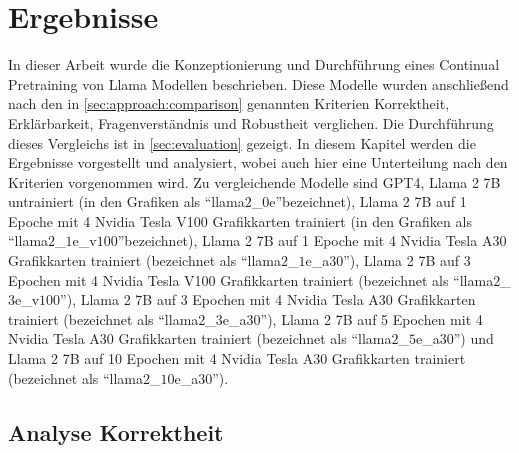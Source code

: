 \chapter{Ergebnisse}\label{ch:results}
\newcommand{\lo}{\enquote{llama$2$\_$0$e}}
\newcommand{\liv}{\enquote{llama$2$\_$1$e\_v$100$}}
\newcommand{\lia}{\enquote{llama$2$\_$1$e\_a$30$}}
\newcommand{\lev}{\enquote{llama$2$\_$3$e\_v$100$}}
\newcommand{\lea}{\enquote{llama$2$\_$3$e\_a$30$}}
\newcommand{\lsa}{\enquote{llama$2$\_$5$e\_a$30$}}
\newcommand{\lioa}{\enquote{llama$2$\_$10$e\_a$30$}}

In dieser Arbeit wurde die Konzeptionierung und Durchführung eines Continual Pretraining von Llama Modellen beschrieben.
Diese Modelle wurden anschließend nach den in \cref{sec:approach:comparison} genannten Kriterien Korrektheit, Erklärbarkeit, Fragenverständnis und Robustheit verglichen.
Die Durchführung dieses Vergleichs ist in \cref{sec:evaluation} gezeigt.
In diesem Kapitel werden die Ergebnisse vorgestellt und analysiert, wobei auch hier eine Unterteilung nach den Kriterien vorgenommen wird.
Zu vergleichende Modelle sind GPT4,
Llama 2 7B untrainiert (in den Grafiken als \lo bezeichnet),
Llama 2 7B auf 1 Epoche mit 4 Nvidia Tesla V100 Grafikkarten trainiert (in den Grafiken als \liv bezeichnet),
Llama 2 7B auf 1 Epoche mit 4 Nvidia Tesla A30 Grafikkarten trainiert (bezeichnet als \lia),
Llama 2 7B auf 3 Epochen mit 4 Nvidia Tesla V100 Grafikkarten trainiert (bezeichnet als \lev),
Llama 2 7B auf 3 Epochen mit 4 Nvidia Tesla A30 Grafikkarten trainiert (bezeichnet als \lea),
Llama 2 7B auf 5 Epochen mit 4 Nvidia Tesla A30 Grafikkarten trainiert (bezeichnet als \lsa) und
Llama 2 7B auf 10 Epochen mit 4 Nvidia Tesla A30 Grafikkarten trainiert (bezeichnet als \lioa).



\section{Analyse Korrektheit}\label{sec:results:correctness}
